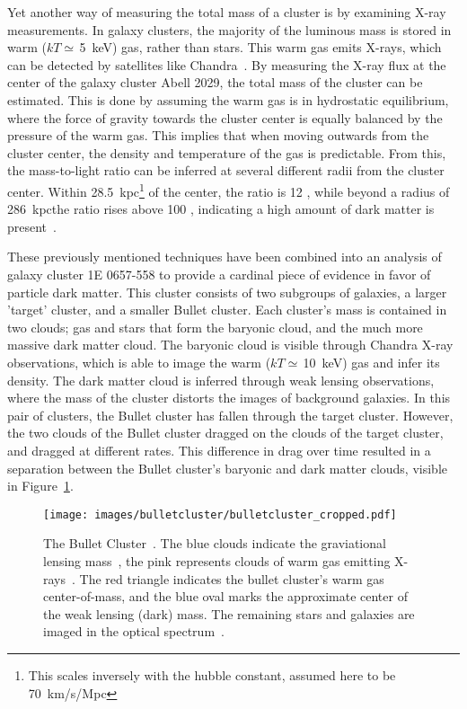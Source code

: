 Yet another way of measuring the total mass of a cluster is by examining X-ray measurements.
In galaxy clusters, the majority of the luminous mass is stored in warm ($kT\simeq\,$\SI{5}{keV}) gas, rather than stars.
This warm gas emits X-rays, which can be detected by satellites like Chandra~\cite{chandra}.
By measuring the X-ray flux at the center of the galaxy cluster Abell 2029, the total mass of the cluster can be estimated.
This is done by assuming the warm gas is in hydrostatic equilibrium, where the force of gravity towards the cluster center is equally balanced by the pressure of the warm gas.
This implies that when moving outwards from the cluster center, the density and temperature of the gas is predictable.
From this, the mass-to-light ratio can be inferred at several different radii from the cluster center.
Within \SI{28.5}{kpc}\footnote[2]{This scales inversely with the hubble constant, assumed here to be \SI{70}{km/s/Mpc}} of the center, the ratio is 12 \MLsol, while beyond a radius of \SI{286}{kpc}\footnotemark[2] the ratio rises above 100 \MLsol{}, indicating a high amount of dark matter is present~\cite{cluster_chandra}.

These previously mentioned techniques have been combined into an analysis of galaxy cluster 1E 0657-558 to provide a cardinal piece of evidence in favor of particle dark matter.
This cluster consists of two subgroups of galaxies, a larger 'target' cluster, and a smaller Bullet cluster.
Each cluster's mass is contained in two clouds; gas and stars that form the baryonic cloud, and the much more massive dark matter cloud.
The baryonic cloud is visible through Chandra X-ray observations, which is able to image the warm ($kT\simeq\,$\SI{10}{keV}) gas and infer its density.
The dark matter cloud is inferred through weak lensing observations, where the mass of the cluster distorts the images of background galaxies.
In this pair of clusters, the Bullet cluster has fallen through the target cluster.
However, the two clouds of the Bullet cluster dragged on the clouds of the target cluster, and dragged at different rates.
This difference in drag over time resulted in a separation between the Bullet cluster's baryonic and dark matter clouds, visible in Figure~\ref{fig:bullet}.

\begin{figure}[ht]
  \centering
  \texttt{[image: images/bulletcluster/bulletcluster\_cropped.pdf]}
  \caption[The Bullet Cluster]{
    The Bullet Cluster~\cite{bullet_cluster_combined_image}.
    The blue clouds indicate the graviational lensing mass~\cite{bullet_cluster}, the pink represents clouds of warm gas emitting X-rays~\cite{bullet_cluster_chandramap}.
    The red triangle indicates the bullet cluster's warm gas center-of-mass, and the blue oval marks the approximate center of the weak lensing (dark) mass.
    The remaining stars and galaxies are imaged in the optical spectrum~\cite{bullet_cluster_composite}.}
  \label{fig:bullet}
\end{figure}
    
